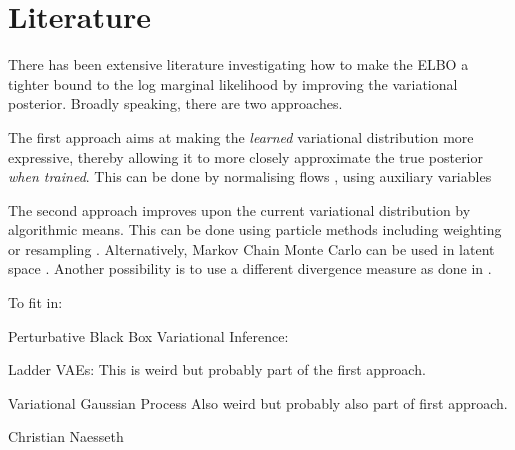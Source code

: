 \section{Literature}
There has been extensive literature investigating how to make the ELBO a tighter bound to the log marginal likelihood by improving the variational posterior.
Broadly speaking, there are two approaches.

The first approach aims at making the \emph{learned} variational distribution more expressive, thereby allowing it to more closely approximate the true posterior \emph{when trained}.
This can be done by normalising flows \citep{rezende_variational_2015,kingma2016improving},
using auxiliary variables \citep{maaloe_auxiliary_2016} \citep{ranganath2016hierarchical}

The second approach improves upon the current variational distribution by algorithmic means. This can be done using particle methods including weighting \citep{burda2015importance} or resampling \citep{maddison2017filtering}\citep{le2017auto}. Alternatively, Markov Chain Monte Carlo can be used in latent space \citep{salimans_markov_2015}.
Another possibility is to use a different divergence measure as done in \citep{li2016renyi}.


To fit in:

Perturbative Black Box Variational Inference:
\citep{bamler_perturbative_2017}

Ladder VAEs:
\citep{so_nderby_ladder_2016}
This is weird but probably part of the first approach.

Variational Gaussian Process
\citep{tran_variational_2015}
Also weird but probably also part of first approach.

Christian Naesseth
\citep{naesseth2017variational}
